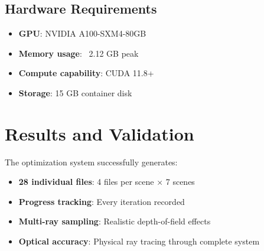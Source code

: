 \documentclass[11pt]{article}
\begin{document}
\subsection{Hardware Requirements}
\begin{itemize}
    \item \textbf{GPU}: NVIDIA A100-SXM4-80GB
    \item \textbf{Memory usage}: ~2.12 GB peak
    \item \textbf{Compute capability}: CUDA 11.8+
    \item \textbf{Storage}: 15 GB container disk
\end{itemize}

\section{Results and Validation}

The optimization system successfully generates:
\begin{itemize}
    \item \textbf{28 individual files}: 4 files per scene × 7 scenes
    \item \textbf{Progress tracking}: Every iteration recorded
    \item \textbf{Multi-ray sampling}: Realistic depth-of-field effects
    \item \textbf{Optical accuracy}: Physical ray tracing through complete system
\end{itemize}
\end{document}
